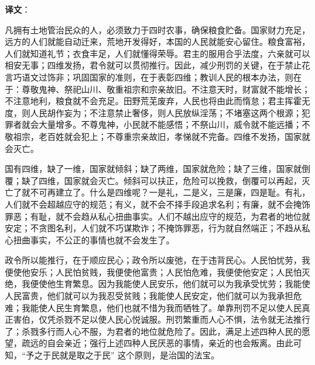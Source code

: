 \documentclass[12pt,UTF-8,openany]{ctexbook}
\begin{document}
\newpage

\textbf{译文}：

\vspace{1em}

\begin{normalsize}
    
    凡拥有土地管治民众的人，必须致力于四时农事，确保粮食贮备。国家财力充足，远方的人们就能自动迁来，荒地开发得好，本国的人民就能安心留住。粮食富裕，人们就知道礼节；衣食丰足，人们就懂得荣辱。君主的服用合乎法度，六亲就可以相安无事；四维发扬，君令就可以贯彻推行。因此，减少刑罚的关键，在于禁止花言巧语文过饰非；巩固国家的准则，在于表彰四维；教训人民的根本办法，则在于：尊敬鬼神、祭祀山川、敬重祖宗和宗亲故旧。不注意天时，财富就不能增长；不注意地利，粮食就不会充足。田野荒芜废弃，人民也将由此而惰怠；君主挥霍无度，则人民胡作妄为；不注意禁止奢侈，则人民放纵淫荡；不堵塞这两个根源；犯罪者就会大量增多。不尊鬼神，小民就不能感悟；不祭山川，威令就不能远播；不敬祖宗，老百姓就会犯上；不尊重宗亲故旧，孝悌就不完备。四维不发扬，国家就会灭亡。
    
    国有四维，缺了一维，国家就倾斜；缺了两维，国家就危险；缺了三维，国家就倒覆；缺了四维，国家就会灭亡。倾斜可以扶正，危险可以挽救，倒覆可以再起，灭亡了就不可再建立了。什么是四维呢？一是礼，二是义，三是廉，四是耻。有礼，人们就不会超越应守的规范；有义，就不会不择手段追求名利；有廉，就不会掩饰罪恶；有耻，就不会趋从私心扭曲事实。人们不越出应守的规范，为君者的地位就安定；不贪图名利，人们就不巧谋欺诈；不掩饰罪恶，行为就自然端正；不趋从私心扭曲事实，不公正的事情也就不会发生了。
    
    政令所以能推行，在于顺应民心；政令所以废弛，在于违背民心。人民怕忧劳，我便使他安乐；人民怕贫贱，我便使他富贵；人民怕危难，我便使他安定；人民怕灭绝，我便使他生育繁息。因为我能使人民安乐，他们就可以为我承受忧劳；我能使人民富贵，他们就可以为我忍受贫贱；我能使人民安定，他们就可以为我承担危难；我能使人民生育繁息，他们也就不惜为我而牺牲了。单靠刑罚不足以使人民真正害伯，仅凭杀戮不足以使人民心悦诚服。刑罚繁重而人心不惧，法令就无法推行了；杀戮多行而人心不服，为君者的地位就危险了。因此，满足上述四种人民的愿望，疏远的自会亲近；强行上述四种人民厌恶的事情，亲近的也会叛离。由此可知，“予之于民就是取之于民” 这个原则，是治国的法宝。
    

\end{normalsize}
\end{document}
